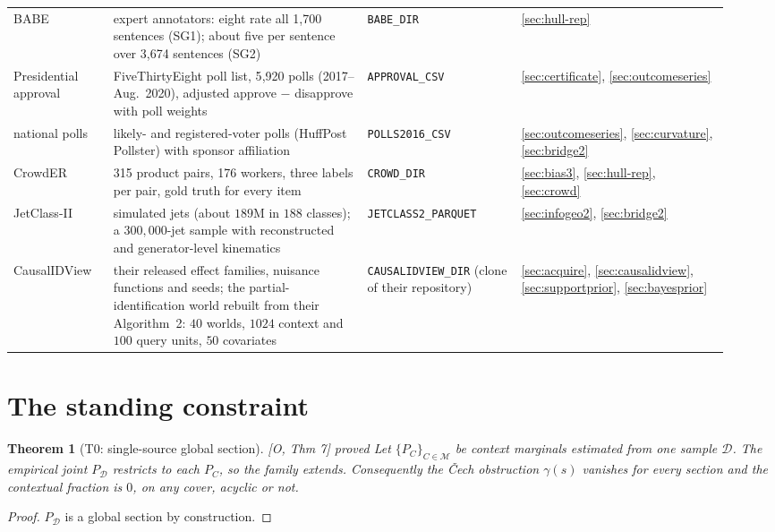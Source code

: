 \documentclass[11pt]{article}
\newtheorem{theorem}{Theorem}[section]
\theoremstyle{definition}
\theoremstyle{remark}
\newcommand{\src}[1]{\textsf{\small[#1]}}
\newcommand{\st}[1]{\textsf{\small\color{gray}#1}}
\begin{document}
{\begin{longtable}{>{\raggedright\arraybackslash}p{0.13\linewidth}>{\raggedright\arraybackslash}p{0.33\linewidth}>{\raggedright\arraybackslash}p{0.2\linewidth}>{\raggedright\arraybackslash}p{0.27\linewidth}}
BABE \cite{babe} & expert annotators: eight rate all 1{,}700 sentences (SG1); about five per sentence over 3{,}674 sentences (SG2) & \texttt{BABE\_DIR} & \ref{sec:hull-rep}\\
Presidential approval \cite{fte} & FiveThirtyEight poll list, 5{,}920 polls (2017--Aug.\ 2020), adjusted approve $-$ disapprove with poll weights & \texttt{APPROVAL\_CSV} & \ref{sec:certificate}, \ref{sec:outcomeseries}\\
2016 national polls \cite{econpolls} & 562 likely- and registered-voter polls (HuffPost Pollster) with sponsor affiliation & \texttt{POLLS2016\_CSV} & \ref{sec:outcomeseries}, \ref{sec:curvature}, \ref{sec:bridge2}\\
CrowdER \cite{wang12crowder,zheng17truth} & 8{,}315 product pairs, 176 workers, three labels per pair, gold truth for every item & \texttt{CROWD\_DIR} & \ref{sec:bias3}, \ref{sec:hull-rep}, \ref{sec:crowd}\\
JetClass-II \cite{jetclass2} & simulated jets (about $189$M in $188$ classes); a $300{,}000$-jet sample with reconstructed and generator-level kinematics & \texttt{JETCLASS2\_PARQUET} & \ref{sec:infogeo2}, \ref{sec:bridge2}\\
CausalIDView \cite{causalidview} & their released effect families, nuisance functions and seeds; the partial-identification world rebuilt from their Algorithm~2: $40$ worlds, $1024$ context and $100$ query units, $50$ covariates & \texttt{CAUSALIDVIEW\_DIR} (clone of their repository) & \ref{sec:acquire}, \ref{sec:causalidview}, \ref{sec:supportprior}, \ref{sec:bayesprior}\\
\end{longtable}}

\section{The standing constraint}

\begin{theorem}[T0: single-source global section]\label{thm:T0}
\src{O, Thm 7} \st{proved}
Let $\{P_C\}_{C\in\mathcal M}$ be context marginals estimated from one sample $\mathcal D$. The empirical joint $P_{\mathcal D}$ restricts to each $P_C$, so the family extends. Consequently the \v{C}ech obstruction $\gamma(s)$ vanishes for every section and the contextual fraction is $0$, on any cover, acyclic or not.
\end{theorem}
\begin{proof}
$P_{\mathcal D}$ is a global section by construction.
\end{proof}
\end{document}
